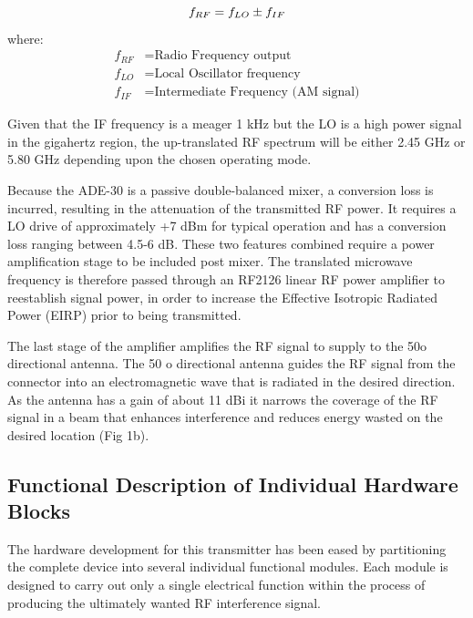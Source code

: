 \documentclass[12pt,a4paper]{report}
\begin{document}
	\begingroup
	\setlength{\mathindent}{0pt}
	\begin{equation*}
		\hfill
		f_{RF}=f_{LO}\pm f_{IF}
		\hfill
	\end{equation*}
	\endgroup
	where:
	\begin{align*}
		f_{RF} &= \text{Radio Frequency output} \\
		f_{LO} &= \text{Local Oscillator frequency} \\
		f_{IF} &= \text{Intermediate Frequency (AM signal)}
	\end{align*}
	\vspace{0.5cm}
	
	Given that the IF frequency is a meager 1 kHz but the LO is a high power signal in the gigahertz region, the up-translated RF spectrum will be either 2.45 GHz or 5.80 GHz depending upon the chosen operating mode.
	\vspace{0.5cm}
	
	Because the ADE-30 is a passive double-balanced mixer, a conversion loss is incurred, resulting in the attenuation of the transmitted RF power. It requires a LO drive of approximately +7 dBm for typical operation and has a conversion loss ranging between 4.5-6 dB. These two features combined require a power amplification stage to be included post mixer.
	The translated microwave frequency is therefore passed through an RF2126 linear RF power amplifier to reestablish signal power, in order to increase the Effective Isotropic Radiated Power (EIRP) prior to being transmitted.
	\vspace{0.5cm}
	
	The last stage of the amplifier amplifies the RF signal to supply to the 50o directional antenna. The 50 o directional antenna guides the RF signal from the connector into an electromagnetic wave that is radiated in the desired direction. As the antenna has a gain of about 11 dBi it narrows the coverage of the RF signal in a beam that enhances interference and reduces energy wasted on the desired location (Fig 1b).
	
	
	\subsection{Functional Description of Individual Hardware Blocks}
	The hardware development for this transmitter has been eased by partitioning the complete device into several individual functional modules. Each module is designed to carry out only a single electrical function within the process of producing the ultimately wanted RF interference signal.
	
\end{document}
